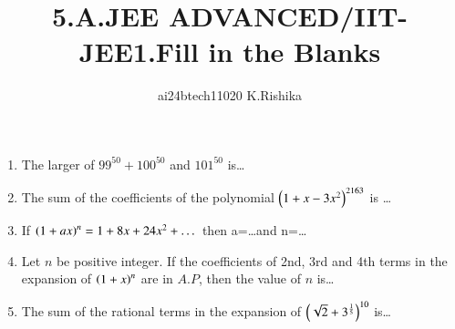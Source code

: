 \documentclass[journal,12pt,onecolumn]{IEEEtran}
\theoremstyle{remark}
\begin{document}

\vspace{3cm}

\title{5.A.JEE ADVANCED/IIT-JEE1.Fill in the Blanks}
\author{ai24btech11020 K.Rishika}

\maketitle
\bigskip   
\renewcommand{\thefigure}{\theenumi}
\renewcommand{\thetable}{\theenumi}     
\begin{enumerate}[start=1]
\item The larger of $99^{50}+100^{50}$ and $101^{50}$ is\dots \hfill {}
\item The sum of the coefficients of the polynomial $\left(1+x-3x^2\right)^{2163}$ is \dots \hfill {}
\item If $\left(1+ax\right)^n=1+8x+24x^2+\dots$ then a=\dots and n=\dots
	\hfill {}
\item Let $n$ be positive integer. If the coefficients of 2nd, 3rd and 4th terms in the expansion of $\left(1 + x\right)^n$ are in $A.P$, then the value of $n$ is\dots	\hfill {}
\item The sum of the rational terms in the expansion of $\left(\sqrt{2}+3^\frac{1}{5}\right)^{10}$ is\dots
	\hfill {}
\end{enumerate}
\end{document}
